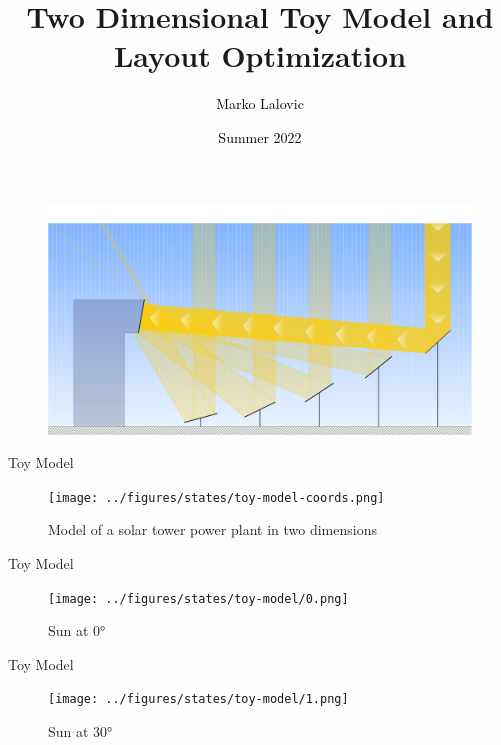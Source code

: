 \documentclass[10pt, xcolor={dvipsnames}]{beamer}
\title[Toy Model]{Two Dimensional Toy Model and Layout Optimization}
\author[\textcolor{white}{Marko Lalovic}]{\textcolor{black}{Marko Lalovic} \vspace{-.7cm}}
\date[\textcolor{white}{July 12, 2022}]{\textcolor{black}{Summer 2022}}
\begin{document}
\begin{frame}
\begin{center}
\maketitle
\begin{figure}
    \includegraphics[width=\linewidth]{../figures/solar-toy-model-crop.pdf}
\end{figure}
\end{center}
\end{frame}


\begin{frame}{Toy Model}

\begin{center}
\begin{figure}
\texttt{[image: ../figures/states/toy-model-coords.png]}
\caption{Model of a solar tower power plant in two dimensions}
\end{figure}
\end{center}
\end{frame}

\begin{frame}{Toy Model}
\begin{center}
\begin{figure}
\texttt{[image: ../figures/states/toy-model/0.png]}
\caption{Sun at 0°}
\end{figure}
\end{center}
\end{frame}

\begin{frame}{Toy Model}
\begin{center}
\begin{figure}
\texttt{[image: ../figures/states/toy-model/1.png]}
\caption{Sun at 30°}
\end{figure}
\end{center}
\end{frame}
\end{document}
